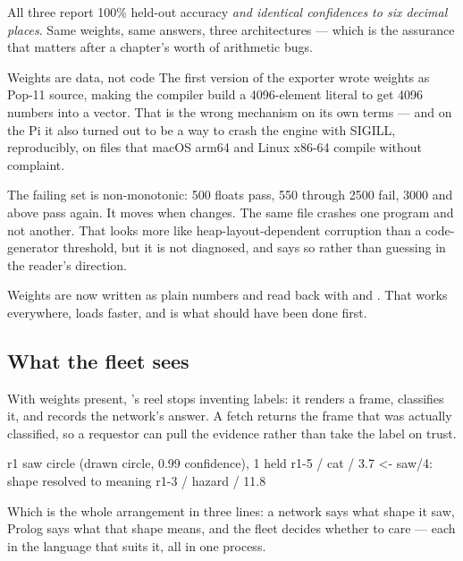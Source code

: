 \noindent All three report 100\% held-out accuracy \emph{and identical
confidences to six decimal places}. Same weights, same answers, three
architectures --- which is the assurance that matters after a chapter's worth
of arithmetic bugs.

\begin{callout}{Weights are data, not code}
The first version of the exporter wrote weights as Pop-11 source, making the
compiler build a 4096-element literal to get 4096 numbers into a vector.
That is the wrong mechanism on its own terms --- and on the Pi it also turned
out to be a way to crash the engine with SIGILL, reproducibly, on files that
macOS arm64 and Linux x86-64 compile without complaint.

The failing set is non-monotonic: 500 floats pass, 550 through 2500 fail,
3000 and above pass again. It moves when  changes. The
same file crashes one program and not another. That looks more like
heap-layout-dependent corruption than a code-generator threshold, but it is
not diagnosed, and  says so
rather than guessing in the reader's direction.

Weights are now written as plain numbers and read back with
 and . That works everywhere, loads
faster, and is what should have been done first.
\end{callout}

\subsection{What the fleet sees}

With weights present, 's reel stops inventing labels: it
renders a frame, classifies it, and records the network's answer. A fetch
returns the frame that was actually classified, so a requestor can pull the
evidence rather than take the label on trust.

\begin{repl}
[reel] r1 saw circle (drawn circle, 0.99 confidence), 1 held
r1-5 / cat / 3.7          <- saw/4: shape resolved to meaning
r1-3 / hazard / 11.8
\end{repl}

\noindent Which is the whole arrangement in three lines: a network says what
shape it saw, Prolog says what that shape means, and the fleet decides
whether to care --- each in the language that suits it, all in one process.

